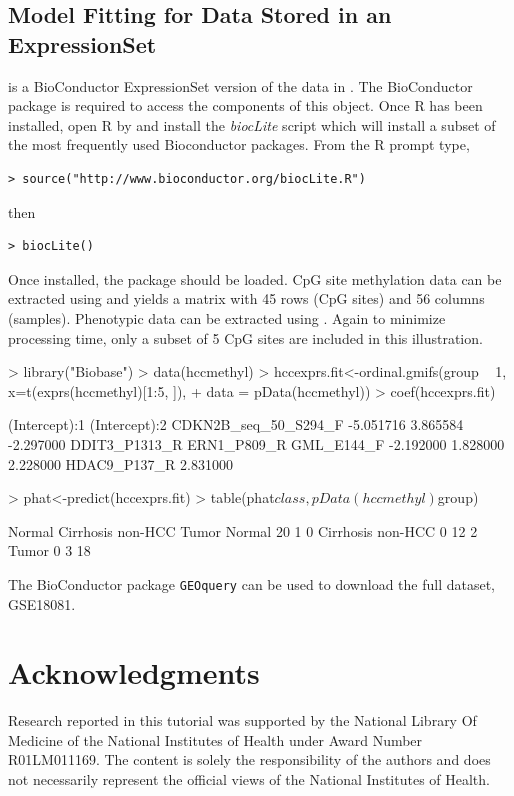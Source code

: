 \documentclass[article, shortclass, nojss]{jss}
\begin{document}
\subsection{Model Fitting for Data Stored in an ExpressionSet}
 is a BioConductor ExpressionSet version of the data in . The  BioConductor package is required to access the components of this object. Once R has been installed, open R by and install the \textit{biocLite} script which will install a subset of the most frequently used Bioconductor packages. From the R prompt type,
\begin{verbatim}
> source("http://www.bioconductor.org/biocLite.R")
\end{verbatim}
then
\begin{verbatim}
> biocLite() 
\end{verbatim}
Once installed, the  package should be loaded. CpG site methylation data can be extracted using  and yields a matrix with 45 rows (CpG sites) and  56 columns (samples). Phenotypic data can be extracted using . Again to minimize processing time, only a subset of 5 CpG sites are included in this illustration.
\begin{Schunk}
\begin{Sinput}
> library("Biobase")
> data(hccmethyl)
> hccexprs.fit<-ordinal.gmifs(group ~ 1, x=t(exprs(hccmethyl)[1:5, ]), 
+ 	data = pData(hccmethyl))
> coef(hccexprs.fit)
\end{Sinput}
\begin{Soutput}
       (Intercept):1        (Intercept):2 CDKN2B_seq_50_S294_F 
           -5.051716             3.865584            -2.297000 
       DDIT3_P1313_R          ERN1_P809_R           GML_E144_F 
           -2.192000             1.828000             2.228000 
        HDAC9_P137_R 
            2.831000 
\end{Soutput}
\begin{Sinput}
> phat<-predict(hccexprs.fit)
> table(phat$class, pData(hccmethyl)$group)
\end{Sinput}
\begin{Soutput}
                    Normal Cirrhosis non-HCC Tumor
  Normal                20                 1     0
  Cirrhosis non-HCC      0                12     2
  Tumor                  0                 3    18
\end{Soutput}
\end{Schunk}
The BioConductor package \texttt{GEOquery} can be used to download the full dataset, GSE18081. 

\section*{Acknowledgments}
Research reported in this tutorial was supported by the National Library Of Medicine of the National Institutes of Health under Award Number R01LM011169. The content is solely the responsibility of the authors and does not necessarily represent the official views of the National Institutes of Health.


\end{document}
